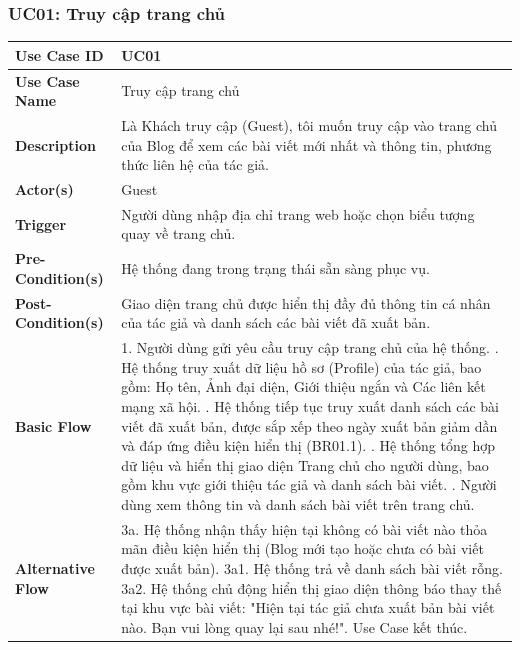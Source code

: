 \documentclass[a4paper,12pt]{article}
\begin{document}
\subsubsection{UC01: Truy cập trang chủ}
\begin{longtable}{|p{4cm}|p{11.5cm}|}
\hline
\textbf{Use Case ID} & UC01 \\ \hline
\textbf{Use Case Name} & Truy cập trang chủ \\ \hline
\textbf{Description} & Là Khách truy cập (Guest), tôi muốn truy cập vào trang chủ của Blog để xem các bài viết mới nhất và thông tin, phương thức liên hệ của tác giả. \\ \hline
\textbf{Actor(s)} & Guest \\ \hline
\textbf{Trigger} & Người dùng nhập địa chỉ trang web hoặc chọn biểu tượng quay về trang chủ. \\ \hline
\textbf{Pre-Condition(s)} & Hệ thống đang trong trạng thái sẵn sàng phục vụ. \\ \hline
\textbf{Post-Condition(s)} & Giao diện trang chủ được hiển thị đầy đủ thông tin cá nhân của tác giả và danh sách các bài viết đã xuất bản. \\ \hline
\textbf{Basic Flow} & 
1. Người dùng gửi yêu cầu truy cập trang chủ của hệ thống. \newline
2. Hệ thống truy xuất dữ liệu hồ sơ (Profile) của tác giả, bao gồm: Họ tên, Ảnh đại diện, Giới thiệu ngắn và Các liên kết mạng xã hội. \newline
3. Hệ thống tiếp tục truy xuất danh sách các bài viết đã xuất bản, được sắp xếp theo ngày xuất bản giảm dần và đáp ứng điều kiện hiển thị (BR01.1). \newline
4. Hệ thống tổng hợp dữ liệu và hiển thị giao diện Trang chủ cho người dùng, bao gồm khu vực giới thiệu tác giả và danh sách bài viết. \newline
5. Người dùng xem thông tin và danh sách bài viết trên trang chủ. \\ \hline
\textbf{Alternative Flow} & 
3a. Hệ thống nhận thấy hiện tại không có bài viết nào thỏa mãn điều kiện hiển thị (Blog mới tạo hoặc chưa có bài viết được xuất bản). \newline
3a1. Hệ thống trả về danh sách bài viết rỗng. \newline
3a2. Hệ thống chủ động hiển thị giao diện thông báo thay thế tại khu vực bài viết: "Hiện tại tác giả chưa xuất bản bài viết nào. Bạn vui lòng quay lại sau nhé!". \newline
Use Case kết thúc. \\ \hline

\end{longtable}
\end{document}
